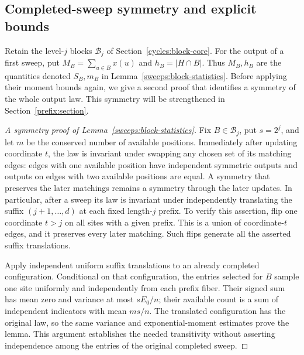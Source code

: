 \subsection{Completed-sweep symmetry and explicit bounds}\label{sweeps:blocks}
Retain the level-$j$ blocks $\mathcal B_j$ of
Section~\ref{cycles:block-core}. For the output of a first sweep, put
$M_B=\sum_{u\in B}x(u)$ and $h_B=|H\cap B|$. Thus $M_B,h_B$ are
the quantities denoted $S_B,m_B$ in
Lemma~\ref{sweeps:block-statistics}. Before applying their moment bounds
again, we give a second proof that identifies a symmetry of the whole
output law. This symmetry will be strengthened in
Section~\ref{prefix:section}.

\begin{proof}[A symmetry proof of Lemma~\ref{sweeps:block-statistics}]
Fix $B\in\mathcal B_j$, put $s=2^j$, and let $m$ be the conserved
number of available positions. Immediately after updating coordinate $t$, the law is invariant under swapping
any chosen set of its matching edges: edges with one available position have independent symmetric
outputs and outputs on edges with two available positions are equal.  A symmetry that preserves the later
matchings remains a symmetry through the later updates.  In particular, after
a sweep its law is invariant under independently translating the suffix
$(j+1,\ldots,d)$ at each fixed length-$j$ prefix.  To verify this assertion,
flip one coordinate $t>j$ on all sites with a given prefix.  This is a union of
coordinate-$t$ edges, and it preserves every later matching.  Such flips
generate all the asserted suffix translations.

Apply independent uniform suffix translations to an already completed
configuration.  Conditional on that configuration, the entries selected for
$B$ sample one site uniformly and independently from each prefix fiber.  Their
signed sum has mean zero and variance at most $sE_0/n$; their available count is a
sum of independent indicators with mean $ms/n$.  The translated configuration
has the original law, so the same variance and exponential-moment estimates
prove the lemma.  This argument establishes the needed transitivity without
asserting independence among the entries of the original completed sweep.
\end{proof}

